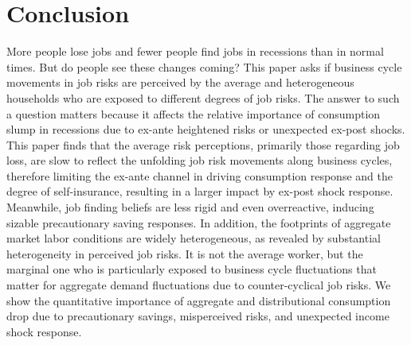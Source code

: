 
\section{Conclusion}
More people lose jobs and fewer people find jobs in recessions than in normal times. But do people see these changes coming? This paper asks if business cycle movements in job risks are perceived by the average and heterogeneous households who are exposed to different degrees of job risks. The answer to such a question matters because it affects the relative importance of consumption slump in recessions due to ex-ante heightened risks or unexpected ex-post shocks. This paper finds that the average risk perceptions, primarily those regarding job loss, are slow to reflect the unfolding job risk movements along business cycles, therefore limiting the ex-ante channel in driving consumption response and the degree of self-insurance, resulting in a larger impact by ex-post shock response. Meanwhile, job finding beliefs are less rigid and even overreactive, inducing sizable precautionary saving responses. In addition, the footprints of aggregate market labor conditions are widely heterogeneous, as revealed by substantial heterogeneity in perceived job risks. It is not the average worker, but the marginal one who is particularly exposed to business cycle fluctuations that matter for aggregate demand fluctuations due to counter-cyclical job risks. We show the quantitative importance of aggregate and distributional consumption drop due to precautionary savings, misperceived risks, and unexpected income shock response. 

